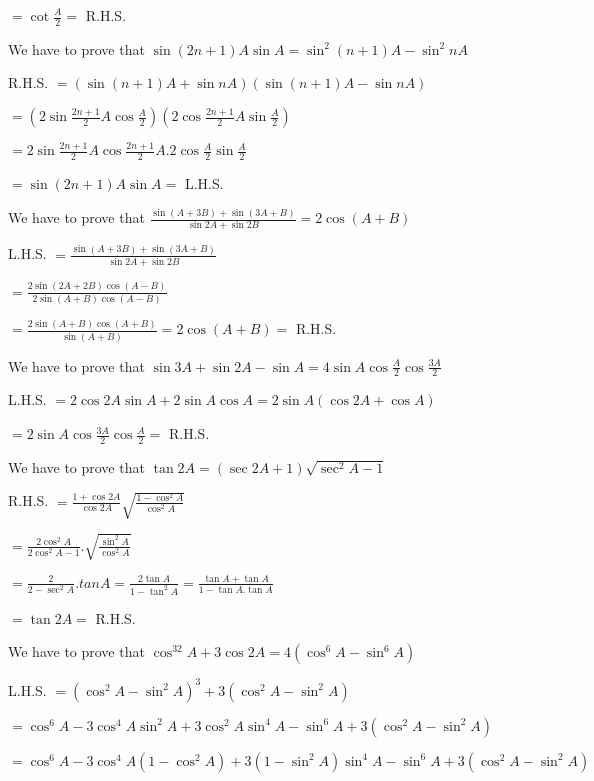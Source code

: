   $= \cot\frac{A}{2} =$ R.H.S.

\item We have to prove that $\sin(2n + 1)A\sin A = \sin^2(n + 1)A - \sin^2nA$

  R.H.S. $= (\sin(n + 1)A + \sin nA)(\sin(n + 1)A - \sin nA)$

  $= (2\sin\frac{2n + 1}{2}A\cos \frac{A}{2})(2\cos\frac{2n + 1}{2}A\sin \frac{A}{2})$

  $= 2\sin\frac{2n + 1}{2}A\cos\frac{2n + 1}{2}A.2\cos \frac{A}{2}\sin\frac{A}{2}$

  $= \sin(2n + 1)A\sin A =$ L.H.S.

\item We have to prove that $\frac{\sin(A + 3B) + \sin(3A + B)}{\sin 2A + \sin 2B} = 2\cos(A + B)$

  L.H.S. $= \frac{\sin(A + 3B) + \sin(3A + B)}{\sin 2A + \sin 2B}$

  $= \frac{2\sin(2A + 2B)\cos(A - B)}{2\sin(A + B)\cos(A - B)}$

  $= \frac{2\sin(A + B)\cos(A + B)}{\sin(A + B)} = 2\cos(A + B) =$ R.H.S.

\item We have to prove that $\sin 3A + \sin 2A - \sin A = 4\sin A\cos \frac{A}{2}\cos \frac{3A}{2}$

  L.H.S. $= 2\cos 2A\sin A + 2\sin A\cos A = 2\sin A(\cos 2A + \cos A)$

  $= 2\sin A\cos \frac{3A}{2}\cos\frac{A}{2} =$ R.H.S.

\item We have to prove that $\tan 2A = (\sec 2A + 1)\sqrt{\sec^2A - 1}$

  R.H.S. $= \frac{1 + \cos 2A}{\cos 2A}\sqrt{\frac{1 - \cos^2A}{\cos^2A}}$

  $= \frac{2\cos^2A}{2\cos^2A - 1}.\sqrt{\frac{\sin^2A}{\cos^2A}}$

  $= \frac{2}{2 - \sec^2A}.tan A = \frac{2\tan A}{1 - \tan^2A} = \frac{\tan A + \tan A}{1 - \tan A.\tan A}$

  $=\tan 2A =$ R.H.S.

\item We have to prove that $\cos^32A + 3\cos 2A = 4(\cos^6A - \sin^6A)$

  L.H.S. $= (\cos^2A - \sin^2A)^3 + 3(\cos^2A - \sin^2A)$

  $= \cos^6A -3\cos^4A\sin^2A + 3\cos^2A\sin^4A - \sin^6A + 3(\cos^2A - \sin^2A)$

  $= \cos^6A -3\cos^4A(1 - \cos^2A) + 3(1 - \sin^2A)\sin^4A - \sin^6A + 3(\cos^2A - \sin^2A)$

